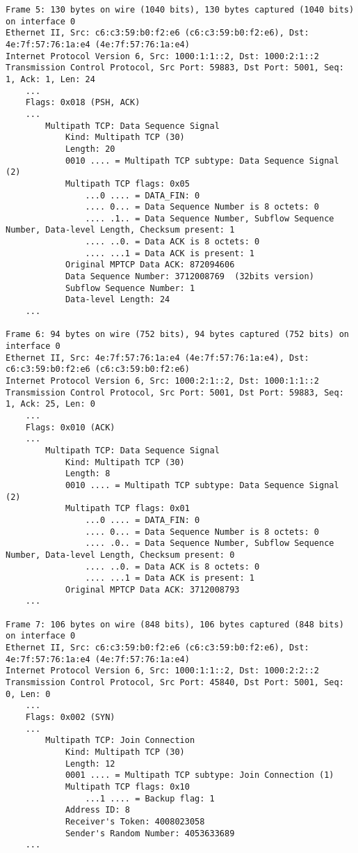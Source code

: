 \begin{verbatim}
Frame 5: 130 bytes on wire (1040 bits), 130 bytes captured (1040 bits) on interface 0
Ethernet II, Src: c6:c3:59:b0:f2:e6 (c6:c3:59:b0:f2:e6), Dst: 4e:7f:57:76:1a:e4 (4e:7f:57:76:1a:e4)
Internet Protocol Version 6, Src: 1000:1:1::2, Dst: 1000:2:1::2
Transmission Control Protocol, Src Port: 59883, Dst Port: 5001, Seq: 1, Ack: 1, Len: 24
    ...
    Flags: 0x018 (PSH, ACK)
    ...
        Multipath TCP: Data Sequence Signal
            Kind: Multipath TCP (30)
            Length: 20
            0010 .... = Multipath TCP subtype: Data Sequence Signal (2)
            Multipath TCP flags: 0x05
                ...0 .... = DATA_FIN: 0
                .... 0... = Data Sequence Number is 8 octets: 0
                .... .1.. = Data Sequence Number, Subflow Sequence Number, Data-level Length, Checksum present: 1
                .... ..0. = Data ACK is 8 octets: 0
                .... ...1 = Data ACK is present: 1
            Original MPTCP Data ACK: 872094606
            Data Sequence Number: 3712008769  (32bits version)
            Subflow Sequence Number: 1
            Data-level Length: 24
    ...

Frame 6: 94 bytes on wire (752 bits), 94 bytes captured (752 bits) on interface 0
Ethernet II, Src: 4e:7f:57:76:1a:e4 (4e:7f:57:76:1a:e4), Dst: c6:c3:59:b0:f2:e6 (c6:c3:59:b0:f2:e6)
Internet Protocol Version 6, Src: 1000:2:1::2, Dst: 1000:1:1::2
Transmission Control Protocol, Src Port: 5001, Dst Port: 59883, Seq: 1, Ack: 25, Len: 0
    ...
    Flags: 0x010 (ACK)
    ...
        Multipath TCP: Data Sequence Signal
            Kind: Multipath TCP (30)
            Length: 8
            0010 .... = Multipath TCP subtype: Data Sequence Signal (2)
            Multipath TCP flags: 0x01
                ...0 .... = DATA_FIN: 0
                .... 0... = Data Sequence Number is 8 octets: 0
                .... .0.. = Data Sequence Number, Subflow Sequence Number, Data-level Length, Checksum present: 0
                .... ..0. = Data ACK is 8 octets: 0
                .... ...1 = Data ACK is present: 1
            Original MPTCP Data ACK: 3712008793
    ...

Frame 7: 106 bytes on wire (848 bits), 106 bytes captured (848 bits) on interface 0
Ethernet II, Src: c6:c3:59:b0:f2:e6 (c6:c3:59:b0:f2:e6), Dst: 4e:7f:57:76:1a:e4 (4e:7f:57:76:1a:e4)
Internet Protocol Version 6, Src: 1000:1:1::2, Dst: 1000:2:2::2
Transmission Control Protocol, Src Port: 45840, Dst Port: 5001, Seq: 0, Len: 0
    ...
    Flags: 0x002 (SYN)
    ...
        Multipath TCP: Join Connection
            Kind: Multipath TCP (30)
            Length: 12
            0001 .... = Multipath TCP subtype: Join Connection (1)
            Multipath TCP flags: 0x10
                ...1 .... = Backup flag: 1
            Address ID: 8
            Receiver's Token: 4008023058
            Sender's Random Number: 4053633689
    ...


\end{verbatim}
